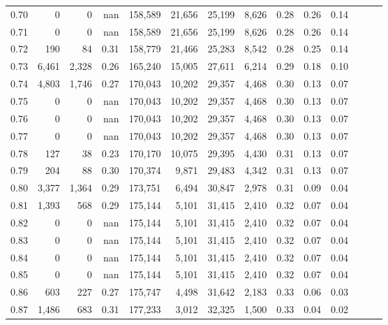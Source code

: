 \begin{tabular}{rrrrrrrrrrrrrr}
0.70 &       0 &      0 &   nan &  158,589 &   21,656 &  25,199 &   8,626 &  0.28 &  0.26 &      0.14 \\
0.71 &       0 &      0 &   nan &  158,589 &   21,656 &  25,199 &   8,626 &  0.28 &  0.26 &      0.14 \\
0.72 &     190 &     84 &  0.31 &  158,779 &   21,466 &  25,283 &   8,542 &  0.28 &  0.25 &      0.14 \\
0.73 &   6,461 &  2,328 &  0.26 &  165,240 &   15,005 &  27,611 &   6,214 &  0.29 &  0.18 &      0.10 \\
0.74 &   4,803 &  1,746 &  0.27 &  170,043 &   10,202 &  29,357 &   4,468 &  0.30 &  0.13 &      0.07 \\
0.75 &       0 &      0 &   nan &  170,043 &   10,202 &  29,357 &   4,468 &  0.30 &  0.13 &      0.07 \\
0.76 &       0 &      0 &   nan &  170,043 &   10,202 &  29,357 &   4,468 &  0.30 &  0.13 &      0.07 \\
0.77 &       0 &      0 &   nan &  170,043 &   10,202 &  29,357 &   4,468 &  0.30 &  0.13 &      0.07 \\
0.78 &     127 &     38 &  0.23 &  170,170 &   10,075 &  29,395 &   4,430 &  0.31 &  0.13 &      0.07 \\
0.79 &     204 &     88 &  0.30 &  170,374 &    9,871 &  29,483 &   4,342 &  0.31 &  0.13 &      0.07 \\
0.80 &   3,377 &  1,364 &  0.29 &  173,751 &    6,494 &  30,847 &   2,978 &  0.31 &  0.09 &      0.04 \\
0.81 &   1,393 &    568 &  0.29 &  175,144 &    5,101 &  31,415 &   2,410 &  0.32 &  0.07 &      0.04 \\
0.82 &       0 &      0 &   nan &  175,144 &    5,101 &  31,415 &   2,410 &  0.32 &  0.07 &      0.04 \\
0.83 &       0 &      0 &   nan &  175,144 &    5,101 &  31,415 &   2,410 &  0.32 &  0.07 &      0.04 \\
0.84 &       0 &      0 &   nan &  175,144 &    5,101 &  31,415 &   2,410 &  0.32 &  0.07 &      0.04 \\
0.85 &       0 &      0 &   nan &  175,144 &    5,101 &  31,415 &   2,410 &  0.32 &  0.07 &      0.04 \\
0.86 &     603 &    227 &  0.27 &  175,747 &    4,498 &  31,642 &   2,183 &  0.33 &  0.06 &      0.03 \\
0.87 &   1,486 &    683 &  0.31 &  177,233 &    3,012 &  32,325 &   1,500 &  0.33 &  0.04 &      0.02 \\

\end{tabular}
